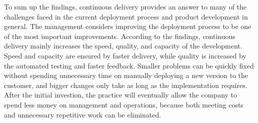 \documentclass[english]{tktltiki2}
\theoremstyle{definition}
\theoremstyle{remark}
\begin{document}


To sum up the findings, continuous delivery provides an answer to many of the challenges faced in the current deployment process and product development in general. The management considers improving the deployment process to be one of the most important improvements. According to the findings, continuous delivery mainly increases the speed, quality, and capacity of the development. Speed and capacity are ensured by faster delivery, while quality is increased by the automated testing and faster feedback. Smaller problems can be quickly fixed without spending unnecessary time on manually deploying a new version to the customer, and bigger changes only take as long as the implementation requires. After the initial investion, the practice will eventually allow the company to spend less money on management and operations, because both meeting costs and unnecessary repetitive work can be eliminated. %





%

\end{document}

